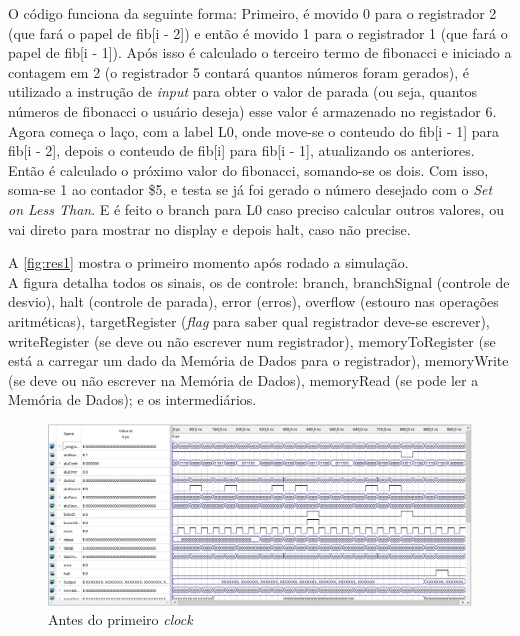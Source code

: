 \documentclass[
	12pt,
	openright,
	a4paper,
	english,			
	french,				
	spanish,			
	brazil,				
	]{abntex2}
\begin{document}
\label{code:fib.asm}


O código funciona da seguinte forma:
Primeiro, é movido 0 para o registrador 2 (que fará o papel de fib[i - 2]) e então
 é movido 1 para o registrador 1 (que fará o papel de fib[i - 1]).
 Após isso é calculado o terceiro termo de fibonacci e iniciado a contagem em 2 (o registrador 5 contará quantos números foram gerados),
 é utilizado a instrução de \textit{input} para obter o valor de parada (ou seja, quantos números de fibonacci o usuário deseja)
 esse valor é armazenado no registador 6.
 Agora começa o laço, com a label L0, onde move-se o conteudo do fib[i - 1] para fib[i - 2], depois o conteudo de fib[i] para fib[i - 1], atualizando os anteriores.
 Então é calculado o próximo valor do fibonacci, somando-se os dois. Com isso, soma-se 1 ao contador \$5, e testa se já foi gerado o número desejado com o \textit{Set on Less Than}.
 E é feito o branch para L0 caso preciso calcular outros valores, ou vai direto para mostrar no display e depois halt, caso não precise.

A \autoref{fig:res1} mostra o primeiro momento após rodado a simulação.\\
A figura detalha todos os sinais, os de controle: branch, branchSignal (controle de desvio), halt (controle de parada), error (erros), overflow (estouro nas operações aritméticas), targetRegister (\emph{flag} para saber qual registrador deve-se escrever), writeRegister (se deve ou não escrever num registrador), 
memoryToRegister (se está a carregar um dado da Memória de Dados para o registrador), memoryWrite (se deve ou não escrever na Memória de Dados), memoryRead (se pode ler a Memória de Dados);
e os intermediários.

\begin{figure}[H]
\centering 
\caption{Antes do primeiro \emph{clock}} \label{fig:res1}
\includegraphics[scale=0.5]{res1.png}
\end{figure}
\end{document}
